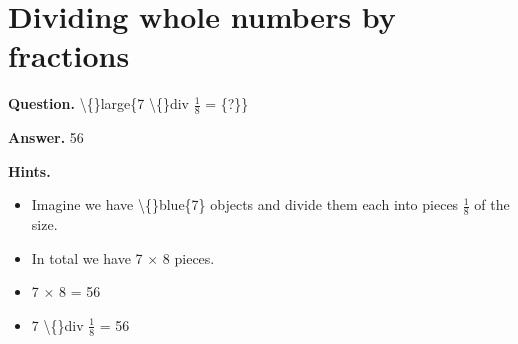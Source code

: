 \documentclass{article}
\begin{document}
\section*{Dividing whole numbers by fractions}
\textbf{Question.} \textbackslash\{\}large\{7 \textbackslash\{\}div $\frac{1}{8}$ = \{?\}\}

\textbf{Answer.} 56

\textbf{Hints.}
\begin{itemize}
  \item Imagine we have \textbackslash\{\}blue\{7\} objects and divide them each into pieces $\frac{1}{8}$ of the size.
  \item In total we have 7 $\times$ 8 pieces.
  \item 7 $\times$ 8 = 56
  \item 7 \textbackslash\{\}div $\frac{1}{8}$ = 56
\end{itemize}
\end{document}

